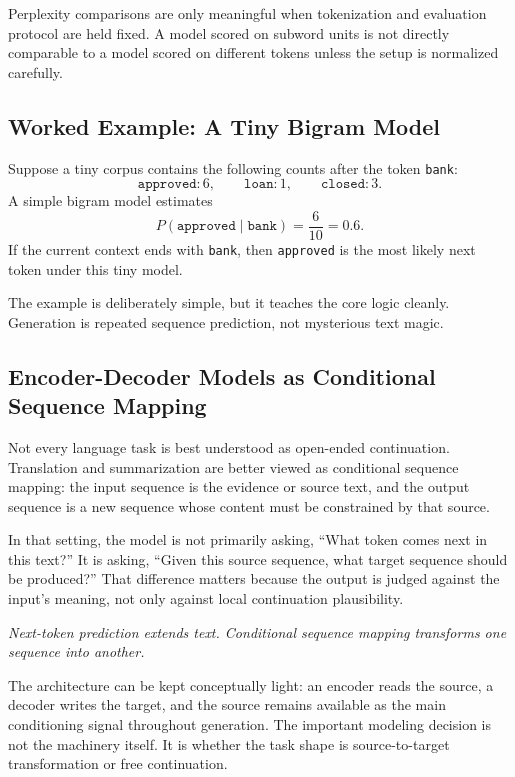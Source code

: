 Perplexity comparisons are only meaningful when tokenization and evaluation protocol are held fixed. A model scored on subword units is not directly comparable to a model scored on different tokens unless the setup is normalized carefully.

\subsection{Worked Example: A Tiny Bigram Model}

Suppose a tiny corpus contains the following counts after the token \texttt{bank}:
\[
\texttt{approved}: 6, \qquad \texttt{loan}: 1, \qquad \texttt{closed}: 3.
\]
A simple bigram model estimates
\[
P(\texttt{approved} \mid \texttt{bank}) = \frac{6}{10} = 0.6.
\]
If the current context ends with \texttt{bank}, then \texttt{approved} is the most likely next token under this tiny model.

The example is deliberately simple, but it teaches the core logic cleanly. Generation is repeated sequence prediction, not mysterious text magic.

\subsection{Encoder-Decoder Models as Conditional Sequence Mapping}

Not every language task is best understood as open-ended continuation. Translation and summarization are better viewed as conditional sequence mapping: the input sequence is the evidence or source text, and the output sequence is a new sequence whose content must be constrained by that source.

In that setting, the model is not primarily asking, ``What token comes next in this text?'' It is asking, ``Given this source sequence, what target sequence should be produced?'' That difference matters because the output is judged against the input's meaning, not only against local continuation plausibility.

\begin{center}
\emph{Next-token prediction extends text. Conditional sequence mapping transforms one sequence into another.}
\end{center}

The architecture can be kept conceptually light: an encoder reads the source, a decoder writes the target, and the source remains available as the main conditioning signal throughout generation. The important modeling decision is not the machinery itself. It is whether the task shape is source-to-target transformation or free continuation.

